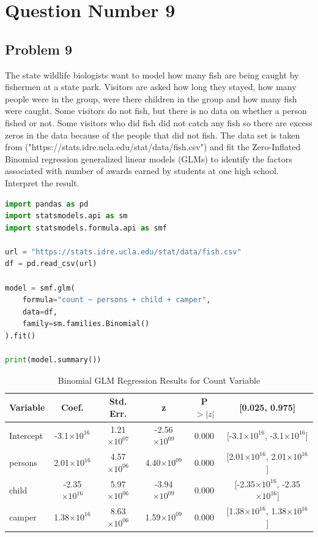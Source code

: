 \documentclass[12pt,a4paper]{report}
\begin{document}
\chapter*{Question Number 9}
\section*{Problem 9}

The state wildlife biologists want to model how many fish are being caught by fishermen at a state park. 
Visitors are asked how long they stayed, how many people were in the group, were there children in the group and how many fish were caught.
Some visitors do not fish, but there is no data on whether a person fished or not. 
Some visitors who did fish did not catch any fish so there are excess zeros in the data because of the people that did not fish.
The data set is taken from ("https://stats.idre.ucla.edu/stat/data/fish.csv") and fit the Zero-Inflated Binomial regression generalized linear models (GLMs) to identify the factors associated with number of awards earned by students at one high school.
Interpret the result.
\begin{lstlisting}[language=Python, caption=Binomial GLM Model in Python]
import pandas as pd
import statsmodels.api as sm
import statsmodels.formula.api as smf

url = "https://stats.idre.ucla.edu/stat/data/fish.csv"
df = pd.read_csv(url)

model = smf.glm(
    formula="count ~ persons + child + camper",
    data=df,
    family=sm.families.Binomial()
).fit()

print(model.summary())
\end{lstlisting}
\begin{table}[h!]
\centering
\begin{tabular}{|l|c|c|c|c|c|}
\hline
\textbf{Variable} & \textbf{Coef.} & \textbf{Std. Err.} & \textbf{z} & \textbf{P$>|z|$} & \textbf{[0.025, 0.975]} \\ \hline
Intercept & -3.1$\times 10^{16}$ & 1.21$\times 10^{07}$ & -2.56$\times 10^{09}$ & 0.000 & [-3.1$\times 10^{16}$, -3.1$\times 10^{16}$] \\ \hline
persons   &  2.01$\times 10^{16}$ & 4.57$\times 10^{06}$ &  4.40$\times 10^{09}$ & 0.000 & [2.01$\times 10^{16}$, 2.01$\times 10^{16}$] \\ \hline
child     & -2.35$\times 10^{16}$ & 5.97$\times 10^{06}$ & -3.94$\times 10^{09}$ & 0.000 & [-2.35$\times 10^{16}$, -2.35$\times 10^{16}$] \\ \hline
camper    &  1.38$\times 10^{16}$ & 8.63$\times 10^{06}$ &  1.59$\times 10^{09}$ & 0.000 & [1.38$\times 10^{16}$, 1.38$\times 10^{16}$] \\ \hline
\end{tabular}
\caption{Binomial GLM Regression Results for Count Variable}
\label{tab:binomial_glm_results}
\end{table}
\end{document}
